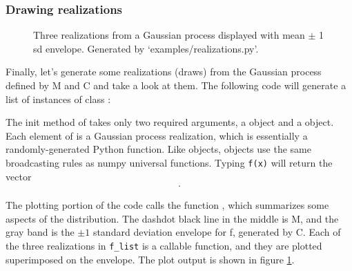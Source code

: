 \documentclass[]{manual}
\begin{document}
\subsubsection{Drawing realizations}\label{subsub:realizations}
\begin{figure}
    \centering
    \caption{Three realizations from a Gaussian process displayed with mean $\pm$ 1 sd envelope. Generated by {\sffamily `examples/realizations.py'}.}
    \label{fig:realizations}
\end{figure}

Finally, let's generate some realizations (draws) from the Gaussian process defined by M and C and take a look at them. The following code will generate a list of instances of class :


    The init method of  takes only two required arguments, a  object and a  object. Each element of  is a Gaussian process realization, which is essentially a randomly-generated Python function. Like  objects,  objects use the same broadcasting rules as numpy universal functions. Typing \texttt{f(x)} will return the vector
\begin{eqnarray*}
    [\texttt{f(x[0])}\ldots \texttt{f(x[N-1])}].
\end{eqnarray*}


The plotting portion of the code calls the function , which summarizes some aspects of the distribution. The dashdot black line in the middle is M, and the gray band is the $\pm 1$ standard deviation envelope for f, generated by C. Each of the three realizations in \texttt{f_list} is a callable function, and they are plotted superimposed on the envelope. The plot output is shown in figure \ref{fig:realizations}.
\end{document}
